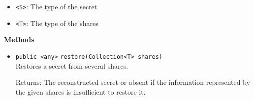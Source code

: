 \begin{itemize}
\item \lstinline|<S>|: The type of the secret
\item \lstinline|<T>|: The type of the shares
\end{itemize}



\textbf{Methods}
\begin{itemize}
\item \lstinline|public <any>| \lstinline|restore|\lstinline|(Collection<T> shares)|\\
Restores a secret from several shares.

Returns: The reconstructed secret or absent if the information represented
 by the given shares is insufficient to restore it.

\end{itemize}


